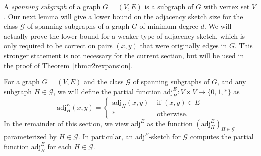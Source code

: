 \documentclass[11pt]{article}
\newtheorem{lemma}[thm]{Lemma}
\theoremstyle{definition}
\newcommand{\G}{\mathcal{G}}
\newcommand{\disc}{\mathrm{Disc}}
\def\F {{\mathcal F}}
\def\G {{\mathcal G}}
\begin{document}


\noindent
A \emph{spanning subgraph} of a graph $G = (V,E)$ is a subgraph of $G$ with vertex set $V$.  Our
next lemma will give a lower bound on the adjacency sketch size for the class $\G$ of spanning
subgraphs of a graph $G$ of minimum degree $d$. We will actually prove the lower bound for a weaker
type of adjacency sketch, which is only required to be correct on pairs $(x,y)$ that were originally
edges in $G$. This stronger statement is not necessary for the current section, but will be used in
the proof of Theorem~\ref{thm:r2rexpansion}.

For a graph $G = (V,E)$ and the class $\G$ of spanning subgraphs of $G$, and any subgraph $H \in
\G$, we will define the partial function $\mathrm{adj}^E_H : V \times V \to \{0,1,*\}$ as
\[
  \mathrm{adj}^E_H(x,y) = \begin{cases}
    \mathrm{adj}_H(x,y) &\text{ if } (x,y) \in E \\
    * &\text{ otherwise.}
  \end{cases}
\]
In the remainder of this section, we view $\mathrm{adj}^E$ as the
function $(\mathrm{adj}^E_H)_{H\in \G}$ parameterized by $H\in \G$. In
particular, an $\mathrm{adj}^E$-sketch for
$\G$ computes  the partial function $\mathrm{adj}^E_H$ for each $H\in \G$.
\end{document}
